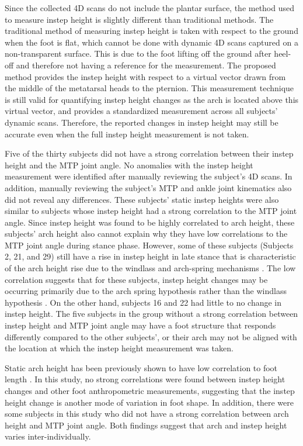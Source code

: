 \documentclass[defaultstyle,11pt]{comps}
\begin{document}
Since the collected 4D scans do not include the plantar surface, the method used to measure instep height is slightly different than traditional methods.
The traditional method of measuring instep height is taken with respect to the ground when the foot is flat, which cannot be done with dynamic 4D scans captured on a non-transparent surface.
This is due to the foot lifting off the ground after heel-off and therefore not having a reference for the measurement.
The proposed method provides the instep height with respect to a virtual vector drawn from the middle of the metatarsal heads to the pternion.
This measurement technique is still valid for quantifying instep height changes as the arch is located above this virtual vector, and provides a standardized measurement across all subjects' dynamic scans.
Therefore, the reported changes in instep height may still be accurate even when the full instep height measurement is not taken.

Five of the thirty subjects did not have a strong correlation between their instep height and the MTP joint angle.
No anomalies with the instep height measurement were identified after manually reviewing the subject's 4D scans.
In addition, manually reviewing the subject's MTP and ankle joint kinematics also did not reveal any differences.
These subjects' static instep heights were also similar to subjects whose instep height had a strong correlation to the MTP joint angle.
Since instep height was found to be highly correlated to arch height, these subjects' arch height also cannot explain why they have low correlations to the MTP joint angle during stance phase.
However, some of these subjects (Subjects 2, 21, and 29) still have a rise in instep height in late stance that is characteristic of the arch height rise due to the windlass and arch-spring mechanisms \citep{Hicks1954, Ker1987}.
The low correlation suggests that for these subjects, instep height changes may be occurring primarily due to the arch spring hypothesis rather than the windlass hypothesis \citep{Ker1987}.
On the other hand, subjects 16 and 22 had little to no change in instep height.
The five subjects in the group without a strong correlation between instep height and MTP joint angle may have a foot structure that responds differently compared to the other subjects', or their arch may not be aligned with the location at which the instep height measurement was taken.

Static arch height has been previously shown to have low correlation to foot length \citep{Hill2017}.
In this study, no strong correlations were found between instep height changes and other foot anthropometric measurements, suggesting that the instep height change is another mode of variation in foot shape.
In addition, there were some subjects in this study who did not have a strong correlation between arch height and MTP joint angle.
Both findings suggest that arch and instep height varies inter-individually.
\end{document}
